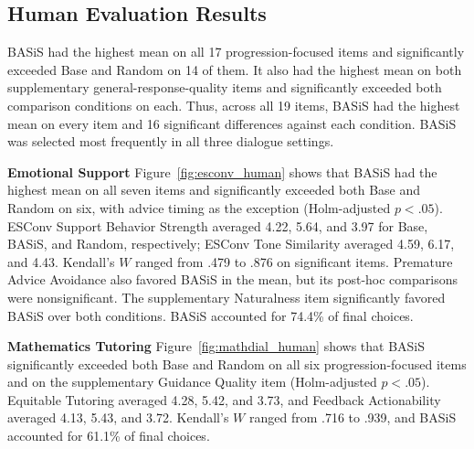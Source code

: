 \documentclass[manuscript,review,anonymous]{acmart}
\begin{document}
\subsection{Human Evaluation Results}
\label{sec:results}

BASiS had the highest mean on all 17 progression-focused items and significantly exceeded Base and Random on 14 of them. It also had the highest mean on both supplementary general-response-quality items and significantly exceeded both comparison conditions on each. Thus, across all 19 items, BASiS had the highest mean on every item and 16 significant differences against each condition. BASiS was selected most frequently in all three dialogue settings.

\noindent\textbf{Emotional Support}\quad
Figure~\ref{fig:esconv_human} shows that BASiS had the highest mean on all seven items and significantly exceeded both Base and Random on six, with advice timing as the exception (Holm-adjusted $p<.05$). ESConv Support Behavior Strength averaged 4.22, 5.64, and 3.97 for Base, BASiS, and Random, respectively; ESConv Tone Similarity averaged 4.59, 6.17, and 4.43. Kendall's $W$ ranged from .479 to .876 on significant items. Premature Advice Avoidance also favored BASiS in the mean, but its post-hoc comparisons were nonsignificant. The supplementary Naturalness item significantly favored BASiS over both conditions. BASiS accounted for 74.4\% of final choices.

\noindent\textbf{Mathematics Tutoring}\quad
Figure~\ref{fig:mathdial_human} shows that BASiS significantly exceeded both Base and Random on all six progression-focused items and on the supplementary Guidance Quality item (Holm-adjusted $p<.05$). Equitable Tutoring averaged 4.28, 5.42, and 3.73, and Feedback Actionability averaged 4.13, 5.43, and 3.72. Kendall's $W$ ranged from .716 to .939, and BASiS accounted for 61.1\% of final choices.
\end{document}
